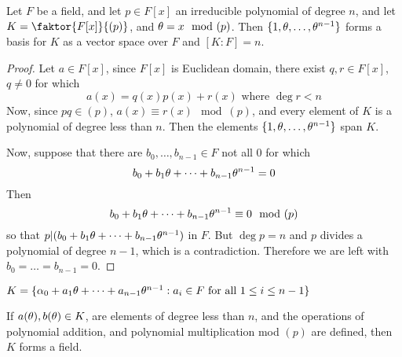 \begin{theorem}\label{1.1.6}
    Let $F$ be a field, and let  $p \in F[x]$ an irreducible polynomial of
    degree $n$, and let  $K=\faktor{F[x]}{(p)}$, and $\theta=x \mod{(p)}$. Then
    $\{1, \theta, \dots, \theta^{n-1}\}$ forms a basis for $K$ as a vector space over
     $F$ and $[K:F]=n$.
\end{theorem}
\begin{proof}
    Let $a \in F[x]$, since $F[x]$ is Euclidean domain, there exist $q,r \in
    F[x]$, $q \neq 0$ for which
    \begin{equation*}
        a(x)=q(x)p(x)+r(x) \text{ where } \deg{r}<n
    \end{equation*}
    Now, since $pq \in (p)$, $a(x) \equiv r(x) \mod{(p)}$, and every element of
    $K$ is a polynomial of degree less than $n$. Then the elements $\{1, \theta,
    \dots, \theta^{n-1}\}$ span $K$.

    Now, suppose that there are  $b_0, \dots, b_{n-1} \in F$ not all $0$ for
    which
    \begin{equation*}
        b_0+b_1\theta+\dots+b_{n-1}\theta^{n-1}=0
    \end{equation*}
    Then
    \begin{equation*}
        b_0+b_1\theta+\dots+b_{n-1}\theta^{n-1} \equiv 0 \mod{(p)}
    \end{equation*}
    so that $p|(b_0+b_1\theta+\dots+b_{n-1}\theta^{n-1})$ in $F$. But  $\deg{p}=n$ and
    $p$ divides a polynomial of degree  $n-1$, which is a contradiction.
    Therefore we are left with  $b_0=\dots=b_{n-1}=0$.
\end{proof}
\begin{corollary}
    $K=\{\alpha_0+a_1\theta+\dots+a_{n-1}\theta^{n-1} : a_i \in F \text{ for all } 1 \leq
    i \leq n-1\}$
\end{corollary}
\begin{corollary}
    If $a(\theta),b(\theta) \in K$, are elements of degree less than $n$, and the
    operations of polynomial addition, and polynomial multiplication mod
    $(p)$ are defined, then $K$ forms a field.
\end{corollary}

